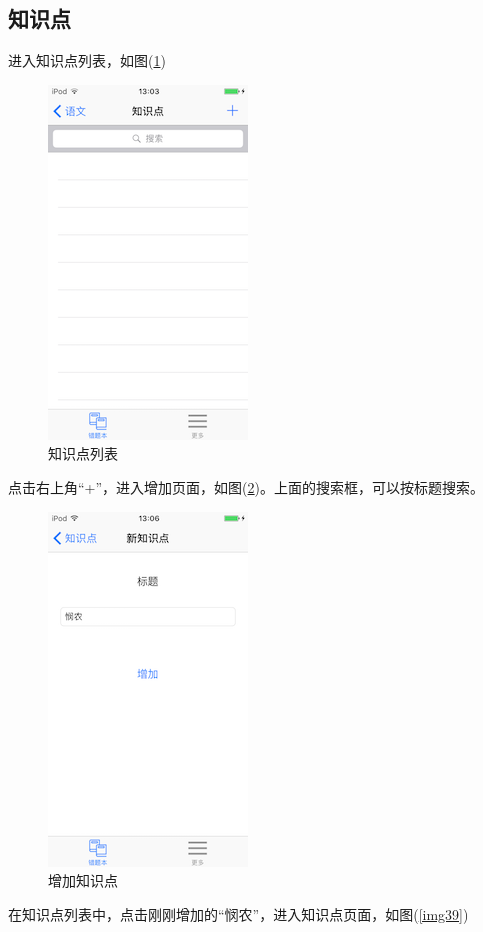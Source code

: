 \subsection{知识点}
进入知识点列表，如图(\ref{img37})
\begin{figure}[H]
	\centering
	\includegraphics{img/37.png}
	\caption{知识点列表}
	\label{img37}
\end{figure}
点击右上角“+”，进入增加页面，如图(\ref{img38})。上面的搜索框，可以按标题搜索。
\begin{figure}[H]
	\centering
	\includegraphics{img/38.png}
	\caption{增加知识点}
	\label{img38}
\end{figure}
在知识点列表中，点击刚刚增加的“悯农”，进入知识点页面，如图(\ref{img39})
